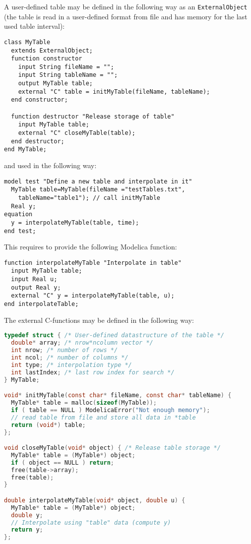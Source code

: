 \begin{example}
A user-defined table may be defined in the following way as an \lstinline!ExternalObject!
(the table is read in a user-defined format from file and has memory for the last used table interval):
\begin{lstlisting}[language=modelica]
class MyTable
  extends ExternalObject;
  function constructor
    input String fileName = "";
    input String tableName = "";
    output MyTable table;
    external "C" table = initMyTable(fileName, tableName);
  end constructor;

  function destructor "Release storage of table"
    input MyTable table;
    external "C" closeMyTable(table);
  end destructor;
end MyTable;
\end{lstlisting}
and used in the following way:
\begin{lstlisting}[language=modelica]
model test "Define a new table and interpolate in it"
  MyTable table=MyTable(fileName ="testTables.txt",
    tableName="table1"); // call initMyTable
  Real y;
equation
  y = interpolateMyTable(table, time);
end test;
\end{lstlisting}

This requires to provide the following Modelica function:
\begin{lstlisting}[language=modelica]
function interpolateMyTable "Interpolate in table"
  input MyTable table;
  input Real u;
  output Real y;
  external "C" y = interpolateMyTable(table, u);
end interpolateTable;
\end{lstlisting}
The external C-functions may be defined in the following way:
\begin{lstlisting}[language=C]
typedef struct { /* User-defined datastructure of the table */
  double* array; /* nrow*ncolumn vector */
  int nrow; /* number of rows */
  int ncol; /* number of columns */
  int type; /* interpolation type */
  int lastIndex; /* last row index for search */
} MyTable;

void* initMyTable(const char* fileName, const char* tableName) {
  MyTable* table = malloc(sizeof(MyTable));
  if ( table == NULL ) ModelicaError("Not enough memory");
  // read table from file and store all data in *table
  return (void*) table;
};

void closeMyTable(void* object) { /* Release table storage */
  MyTable* table = (MyTable*) object;
  if ( object == NULL ) return;
  free(table->array);
  free(table);
}

double interpolateMyTable(void* object, double u) {
  MyTable* table = (MyTable*) object;
  double y;
  // Interpolate using "table" data (compute y)
  return y;
};
\end{lstlisting}
\end{example}
